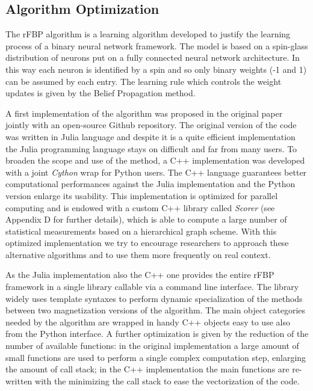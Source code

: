 \documentclass{standalone}
\begin{document}
\subsection[Algorithm Optimization]{Algorithm Optimization}\label{rfbp:rFBP}

The rFBP algorithm is a learning algorithm developed to justify the learning process of a binary neural network framework.
The model is based on a spin-glass distribution of neurons put on a fully connected neural network architecture.
In this way each neuron is identified by a spin and so only binary weights (-1 and 1) can be assumed by each entry.
The learning rule which controls the weight updates is given by the Belief Propagation method.

A first implementation of the algorithm was proposed in the original paper~\cite{BaldassiE7655} jointly with an open-source Github repository.
The original version of the code was written in Julia language and despite it is a quite efficient implementation the Julia programming language stays on difficult and far from many users.
To broaden the scope and use of the method, a \textsf{C++} implementation was developed with a joint \emph{Cython} wrap for Python users.
The \textsf{C++} language guarantees better computational performances against the Julia implementation and the Python version enlarge its usability.
This implementation is optimized for parallel computing and is endowed with a custom \textsf{C++} library called \emph{Scorer} (see Appendix D for further details), which is able to compute a large number of statistical measurements based on a hierarchical graph scheme.
With this optimized implementation we try to encourage researchers to approach these alternative algorithms and to use them more frequently on real context.

As the Julia implementation also the \textsf{C++} one provides the entire rFBP framework in a single library callable via a command line interface.
The library widely uses template syntaxes to perform dynamic specialization of the methods between two magnetization versions of the algorithm.
The main object categories needed by the algorithm are wrapped in handy \textsf{C++} objects easy to use also from the Python interface.
A further optimization is given by the reduction of the number of available functions: in the original implementation a large amount of small functions are used to perform a single complex computation step, enlarging the amount of call stack; in the \textsf{C++} implementation the main functions are re-written with the minimizing the call stack to ease the vectorization of the code.
\end{document}
